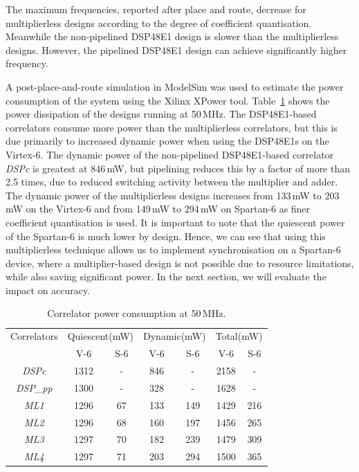 The maximum frequencies, reported after place and route, decrease for multiplierless designs according to the degree of coefficient quantisation.
Meanwhile the non-pipelined DSP48E1 design is slower than the multiplierless designs.
However, the pipelined DSP48E1 design can achieve significantly higher frequency.

A post-place-and-route simulation in ModelSim was used to estimate the power consumption of the system using the Xilinx XPower tool.
Table~\ref{tab:PWR} shows the power dissipation of the designs running at 50\,MHz.
The DSP48E1-based correlators consume more power than the multiplierless correlators, but this is due primarily to increased dynamic power when using the DSP48E1s on the Virtex-6.
The dynamic power of the non-pipelined DSP48E1-based correlator \emph{DSPc} is greatest at 846\,mW, but pipelining reduces this by a factor of more than 2.5 times, due to reduced switching activity between the multiplier and adder.
The dynamic power of the multiplierless designs increases from 133\,mW to 203\,mW on the Virtex-6 and from 149\,mW to 294\,mW on Spartan-6 as finer coefficient quantisation is used.
It is important to note that the quiescent power of the Spartan-6 is much lower by design.
Hence, we can see that using this multiplierless technique allows us to implement synchronisation on a Spartan-6 device, where a multiplier-based design is not possible due to resource limitations, while also saving significant power.
In the next section, we will evaluate the impact on accuracy.

\begin{table}[h]
	\centering
	\caption{Correlator power consumption at 50\,MHz.}
	\label{tab:PWR}
	\begin{tabular}{c|c|c|c|c|c|c}
        \hline \hline
    			Correlators  & \multicolumn{2}{|c|}{Quiescent(mW)} &  \multicolumn{2}{|c|}{Dynamic(mW) }& \multicolumn{2}{|c}{Total(mW)} \\
	\cline{2-7}			& V-6 & S-6 & V-6 & S-6 & V-6 & S-6\\
	\hline
			\emph{DSPc}		&  1312 &  -  	 & 846 & -	& 2158 &-\\
			\emph{DSP\_pp} 	& 1300  &  -   & 328 & - 	& 1628 & -\\
 			\emph{ML1} 		& 1296  & 67 & 133 & 149	& 1429 & 216\\
			\emph{ML2} 		& 1296  & 68 & 160 & 197	& 1456 & 265\\
			\emph{ML3} 		& 1297  & 70 & 182 & 239	& 1479 & 309\\
			\emph{ML4} 		& 1297  & 71 & 203 & 294    & 1500 & 365\\

    	\hline \hline
    \end{tabular}
\end{table}



